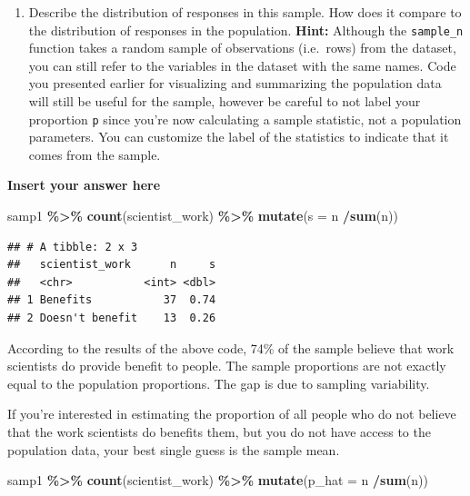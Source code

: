 \documentclass[
]{article}
\newenvironment{Shaded}{\begin{snugshade}}{\end{snugshade}}
\newcommand{\AttributeTok}[1]{\textcolor[rgb]{0.13,0.29,0.53}{#1}}
\newcommand{\FunctionTok}[1]{\textcolor[rgb]{0.13,0.29,0.53}{\textbf{#1}}}
\newcommand{\NormalTok}[1]{#1}
\newcommand{\SpecialCharTok}[1]{\textcolor[rgb]{0.81,0.36,0.00}{\textbf{#1}}}
\providecommand{\tightlist}{%
  \setlength{\itemsep}{0pt}\setlength{\parskip}{0pt}}
\begin{document}
\begin{enumerate}
\def\labelenumi{\arabic{enumi}.}
\tightlist
\item
  Describe the distribution of responses in this sample. How does it
  compare to the distribution of responses in the population.
  \textbf{Hint:} Although the \texttt{sample\_n} function takes a random
  sample of observations (i.e.~rows) from the dataset, you can still
  refer to the variables in the dataset with the same names. Code you
  presented earlier for visualizing and summarizing the population data
  will still be useful for the sample, however be careful to not label
  your proportion \texttt{p} since you're now calculating a sample
  statistic, not a population parameters. You can customize the label of
  the statistics to indicate that it comes from the sample.
\end{enumerate}

\textbf{Insert your answer here}

\begin{Shaded}
\begin{Highlighting}[]
\NormalTok{samp1 }\SpecialCharTok{\%\textgreater{}\%}
  \FunctionTok{count}\NormalTok{(scientist\_work) }\SpecialCharTok{\%\textgreater{}\%}
  \FunctionTok{mutate}\NormalTok{(}\AttributeTok{s =}\NormalTok{ n }\SpecialCharTok{/}\FunctionTok{sum}\NormalTok{(n))}
\end{Highlighting}
\end{Shaded}

\begin{verbatim}
## # A tibble: 2 x 3
##   scientist_work      n     s
##   <chr>           <int> <dbl>
## 1 Benefits           37  0.74
## 2 Doesn't benefit    13  0.26
\end{verbatim}

According to the results of the above code, 74\% of the sample believe
that work scientists do provide benefit to people. The sample
proportions are not exactly equal to the population proportions. The gap
is due to sampling variability.

If you're interested in estimating the proportion of all people who do
not believe that the work scientists do benefits them, but you do not
have access to the population data, your best single guess is the sample
mean.

\begin{Shaded}
\begin{Highlighting}[]
\NormalTok{samp1 }\SpecialCharTok{\%\textgreater{}\%}
  \FunctionTok{count}\NormalTok{(scientist\_work) }\SpecialCharTok{\%\textgreater{}\%}
  \FunctionTok{mutate}\NormalTok{(}\AttributeTok{p\_hat =}\NormalTok{ n }\SpecialCharTok{/}\FunctionTok{sum}\NormalTok{(n))}
\end{Highlighting}
\end{Shaded}
\end{document}
